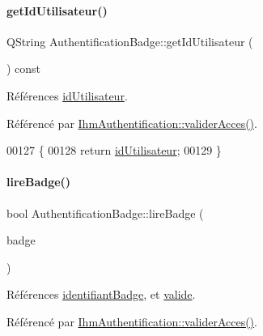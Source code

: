 \paragraph{\texorpdfstring{get\+Id\+Utilisateur()}{getIdUtilisateur()}}
{\footnotesize\ttfamily Q\+String Authentification\+Badge\+::get\+Id\+Utilisateur (\begin{DoxyParamCaption}{ }\end{DoxyParamCaption}) const}



Références \hyperlink{class_authentification_badge_ab26f8f696e807cbffd2c50cbad465b89}{id\+Utilisateur}.



Référencé par \hyperlink{class_ihm_authentification_ad62f646310fff597d3bf50af2c3d5d0c}{Ihm\+Authentification\+::valider\+Acces()}.


\begin{DoxyCode}
00127 \{
00128     \textcolor{keywordflow}{return} \hyperlink{class_authentification_badge_ab26f8f696e807cbffd2c50cbad465b89}{idUtilisateur};
00129 \}
\end{DoxyCode}
\mbox{\label{class_authentification_badge_a77488a375465873bfe6ab62f53abea6d}} 
\paragraph{\texorpdfstring{lire\+Badge()}{lireBadge()}}
{\footnotesize\ttfamily bool Authentification\+Badge\+::lire\+Badge (\begin{DoxyParamCaption}\item[{Q\+String}]{badge }\end{DoxyParamCaption})}



Références \hyperlink{class_authentification_badge_a7120366168cbe21efd991a978922eb20}{identifiant\+Badge}, et \hyperlink{class_authentification_badge_a9d0df9da3663b065a3a6a7a1f37a0a69}{valide}.



Référencé par \hyperlink{class_ihm_authentification_ad62f646310fff597d3bf50af2c3d5d0c}{Ihm\+Authentification\+::valider\+Acces()}.


